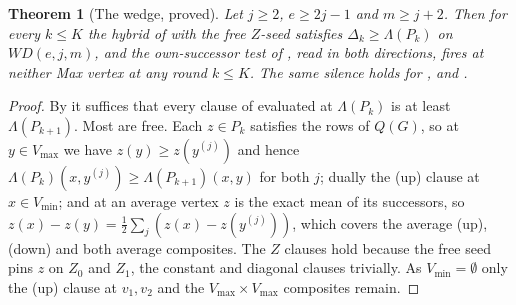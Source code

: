 \documentclass[11pt]{article}
\theoremstyle{plain}
\newtheorem{theorem}{Theorem}[section]
\theoremstyle{definition}
\newcommand{\Vmax}{V_{\max}}
\newcommand{\Vmin}{V_{\min}}
\begin{document}
\begin{theorem}[The wedge, proved]\label{thm:wedge-proved}
Let $j\ge2$, $e\ge2j-1$ and $m\ge j+2$. Then for every $k\le K$ the
hybrid of  with the free $Z$-seed satisfies
$\Delta_k\ge\Lambda(P_k)$ on $WD(e,j,m)$, and the own-successor test of
, read in both directions, fires at neither Max
vertex at any round $k\le K$. The same silence holds for
,  and .
\end{theorem}

\begin{proof}
By  it suffices that every clause of
 evaluated at $\Lambda(P_k)$ is at least
$\Lambda(P_{k+1})$. Most are free. Each $z\in P_k$ satisfies the rows of
$Q(G)$, so at $y\in\Vmax$ we have $z(y)\ge z(y^{(j)})$ and hence
$\Lambda(P_k)(x,y^{(j)})\ge\Lambda(P_{k+1})(x,y)$ for both $j$; dually the
(up) clause at $x\in\Vmin$; and at an average vertex $z$ is the exact mean
of its successors, so
$z(x)-z(y)=\tfrac12\sum_j(z(x)-z(y^{(j)}))$, which covers the average
(up), (down) and both average composites. The $Z$ clauses hold because the
free seed pins $z$ on $Z_0$ and $Z_1$, the constant and diagonal clauses
trivially. As $\Vmin=\emptyset$ only the (up) clause at $v_1,v_2$ and the
$\Vmax\times\Vmax$ composites remain.


\end{proof}
\end{document}
